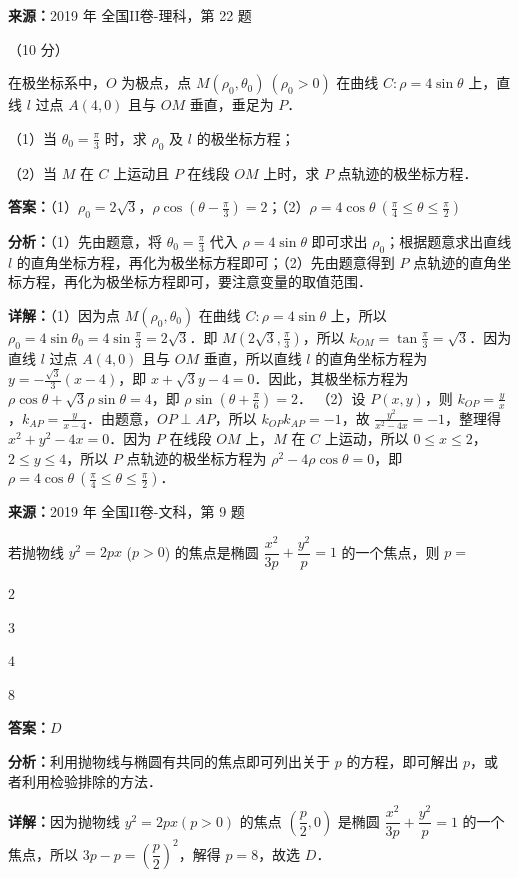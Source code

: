 \begin{question}[points=10]
\textbf{来源：}2019 年 全国II卷-理科，第 22 题\par
[选修 4-4：坐标系与参数方程]（10 分）

在极坐标系中，$O$ 为极点，点 $M(\rho_0,\theta_0)\ (\rho_0>0)$ 在曲线 $C:\rho=4\sin\theta$ 上，直线 $l$ 过点 $A(4,0)$ 且与 $OM$ 垂直，垂足为 $P$．

（1）当 $\theta_0=\frac{\pi}{3}$ 时，求 $\rho_0$ 及 $l$ 的极坐标方程；

（2）当 $M$ 在 $C$ 上运动且 $P$ 在线段 $OM$ 上时，求 $P$ 点轨迹的极坐标方程．
\begin{solution}
\textbf{答案：}（1）$\rho_0=2\sqrt{3}$，$\rho\cos(\theta-\frac{\pi}{3})=2$；（2）$\rho=4\cos\theta\ (\frac{\pi}{4}\leq\theta\leq\frac{\pi}{2})$

\textbf{分析：}（1）先由题意，将 $\theta_0=\frac{\pi}{3}$ 代入 $\rho=4\sin\theta$ 即可求出 $\rho_0$；根据题意求出直线 $l$ 的直角坐标方程，再化为极坐标方程即可；（2）先由题意得到 $P$ 点轨迹的直角坐标方程，再化为极坐标方程即可，要注意变量的取值范围．

\textbf{详解：}（1）因为点 $M(\rho_0,\theta_0)$ 在曲线 $C:\rho=4\sin\theta$ 上，所以 $\rho_0=4\sin\theta_0=4\sin\frac{\pi}{3}=2\sqrt{3}$．即 $M(2\sqrt{3},\frac{\pi}{3})$，所以 $k_{OM}=\tan\frac{\pi}{3}=\sqrt{3}$．因为直线 $l$ 过点 $A(4,0)$ 且与 $OM$ 垂直，所以直线 $l$ 的直角坐标方程为 $y=-\frac{\sqrt{3}}{3}(x-4)$，即 $x+\sqrt{3}y-4=0$．因此，其极坐标方程为 $\rho\cos\theta+\sqrt{3}\rho\sin\theta=4$，即 $\rho\sin(\theta+\frac{\pi}{6})=2$．
（2）设 $P(x,y)$，则 $k_{OP}=\frac{y}{x}$，$k_{AP}=\frac{y}{x-4}$．由题意，$OP\perp AP$，所以 $k_{OP}k_{AP}=-1$，故 $\frac{y^2}{x^2-4x}=-1$，整理得 $x^2+y^2-4x=0$．因为 $P$ 在线段 $OM$ 上，$M$ 在 $C$ 上运动，所以 $0\leq x\leq 2$，$2\leq y\leq 4$，所以 $P$ 点轨迹的极坐标方程为 $\rho^2-4\rho\cos\theta=0$，即 $\rho=4\cos\theta\ (\frac{\pi}{4}\leq\theta\leq\frac{\pi}{2})$．
\end{solution}
\end{question}

\begin{question}[points=5]
\textbf{来源：}2019 年 全国II卷-文科，第 9 题\par
若抛物线 $y^2=2px$ ($p>0$) 的焦点是椭圆 $\dfrac{x^2}{3p}+\dfrac{y^2}{p}=1$ 的一个焦点，则 $p=$
\begin{choices}
  \item $2$
  \item $3$
  \item $4$
  \item $8$
\end{choices}
\begin{solution}
\textbf{答案：}$D$

\textbf{分析：}利用抛物线与椭圆有共同的焦点即可列出关于 $p$ 的方程，即可解出 $p$，或者利用检验排除的方法．

\textbf{详解：}因为抛物线 $y^2=2px(p>0)$ 的焦点 $\left(\dfrac{p}{2},0\right)$ 是椭圆 $\dfrac{x^2}{3p}+\dfrac{y^2}{p}=1$ 的一个焦点，所以 $3p-p=\left(\dfrac{p}{2}\right)^2$，解得 $p=8$，故选 $D$．
\end{solution}
\end{question}


